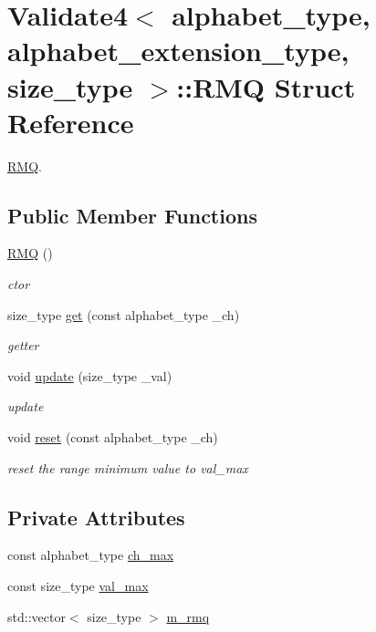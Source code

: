 \hypertarget{struct_validate4_1_1_r_m_q}{}\section{Validate4$<$ alphabet\+\_\+type, alphabet\+\_\+extension\+\_\+type, size\+\_\+type $>$\+:\+:R\+MQ Struct Reference}
\label{struct_validate4_1_1_r_m_q}


\hyperlink{struct_validate4_1_1_r_m_q}{R\+MQ}.  


\subsection*{Public Member Functions}
\begin{DoxyCompactItemize}
\item 
\hyperlink{struct_validate4_1_1_r_m_q_a58a58fb442194bba96116dd76b361882}{R\+MQ} ()
\begin{DoxyCompactList}\small\item\em ctor \end{DoxyCompactList}\item 
size\+\_\+type \hyperlink{struct_validate4_1_1_r_m_q_a25c9ec1cab24c2ea2355b8ce828cf108}{get} (const alphabet\+\_\+type \+\_\+ch)
\begin{DoxyCompactList}\small\item\em getter \end{DoxyCompactList}\item 
void \hyperlink{struct_validate4_1_1_r_m_q_a51f01cfbe100d40fc976fd2e1e8b6d16}{update} (size\+\_\+type \+\_\+val)
\begin{DoxyCompactList}\small\item\em update \end{DoxyCompactList}\item 
void \hyperlink{struct_validate4_1_1_r_m_q_a8416e95d49b4b8c05cd814d78017d81f}{reset} (const alphabet\+\_\+type \+\_\+ch)
\begin{DoxyCompactList}\small\item\em reset the range minimum value to val\+\_\+max \end{DoxyCompactList}\end{DoxyCompactItemize}
\subsection*{Private Attributes}
\begin{DoxyCompactItemize}
\item 
const alphabet\+\_\+type \hyperlink{struct_validate4_1_1_r_m_q_a0addfc5d1067fca9a97939554cb0cd70}{ch\+\_\+max}
\item 
const size\+\_\+type \hyperlink{struct_validate4_1_1_r_m_q_a45aa4f738281304a3f6bd5b9d78ef712}{val\+\_\+max}
\item 
std\+::vector$<$ size\+\_\+type $>$ \hyperlink{struct_validate4_1_1_r_m_q_abf525030d892825a6ef20c45eafaae2b}{m\+\_\+rmq}
\end{DoxyCompactItemize}


